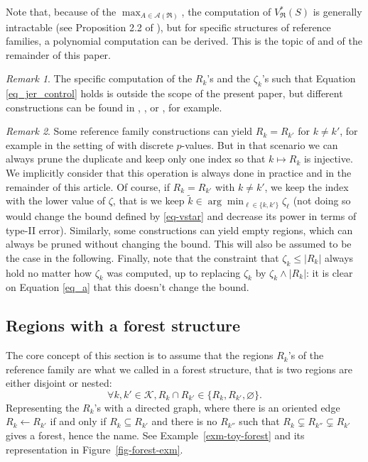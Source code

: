 \documentclass[
  11pt,
  a4paper,
]{article}
\theoremstyle{plain}
\theoremstyle{plain}
\theoremstyle{definition}
\theoremstyle{plain}
\theoremstyle{definition}
\theoremstyle{remark}
\newtheorem{refremark}{Remark}[section]
\begin{document}
Note that, because of the \(\max_{A\in\mathcal A(\mathfrak{R})}\), the
computation of \(V^*_{\mathfrak{R}}(S)\) is generally intractable (see
Proposition 2.2 of \citet{MR4124323}), but for specific structures of
reference families, a polynomial computation can be derived. This is the
topic of \citet{MR4178188} and of the remainder of this paper.

\begin{refremark}
The specific computation of the \(R_k\)'s and the \(\zeta_k\)'s such
that Equation \eqref{eq_jer_control} holds is outside the scope of the
present paper, but different constructions can be found in
\citet{MR4124323}, \citet{MR4178188}, \citet{blain22notip} or
\citet{JMLR:v25:23-1025}, for example.

\label{rem-zeta}

\end{refremark}

\begin{refremark}
Some reference family constructions can yield \(R_k=R_{k'}\) for
\(k\neq k'\), for example in the setting of \citet{JMLR:v25:23-1025}
with discrete \(p\)-values. But in that scenario we can always prune the
duplicate and keep only one index so that \(k\mapsto R_k\) is injective.
We implicitly consider that this operation is always done in practice
and in the remainder of this article. Of course, if \(R_k=R_{k'}\) with
\(k\neq k'\), we keep the index with the lower value of \(\zeta\), that
is we keep \(\tilde k\in\arg\min_{\ell\in\{k,k'\}}\zeta_{\ell}\) (not
doing so would change the bound defined by \eqref{eq-vstar} and decrease
its power in terms of type-II error). Similarly, some constructions can
yield empty regions, which can always be pruned without changing the
bound. This will also be assumed to be the case in the following.
Finally, note that the constraint that \(\zeta_k\leq |R_k|\) always hold
no matter how \(\zeta_k\) was computed, up to replacing \(\zeta_k\) by
\(\zeta_k\wedge |R_k|\): it is clear on Equation \eqref{eq_a} that this
doesn't change the bound.

\label{rem-distinct}

\end{refremark}

\subsection{Regions with a forest structure}\label{sec-forest-structure}

The core concept of this section is to assume that the regions \(R_k\)'s
of the reference family are what we called in \citet{MR4178188} a forest
structure, that is two regions are either disjoint or nested:
\begin{equation}
\forall k,k'\in\mathcal{K} , R_k \cap R_{k'} \in \{ R_k,  R_{k'} , \varnothing \}.
\label{eq-forest}
\end{equation} Representing the \(R_k\)'s with a directed graph, where
there is an oriented edge \(R_k \leftarrow R_{k'}\) if and only if
\(R_k \subseteq R_{k'}\) and there is no \(R_{k''}\) such that
\(R_k \subsetneq R_{k''}\subsetneq R_{k'}\) gives a forest, hence the
name. See Example~\ref{exm-toy-forest} and its representation in
Figure~\ref{fig-forest-exm}.
\end{document}

